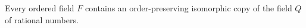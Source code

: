 Every ordered field \(F\) contains an order-preserving isomorphic copy of the field \(Q\) of rational numbers.